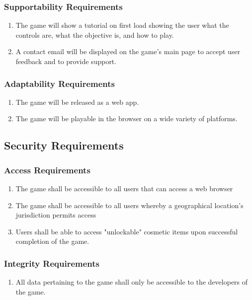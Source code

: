 \documentclass[]{article}
\begin{document}
\subsubsection{Supportability Requirements}
\label{ssub:supportability_requirements}
\begin{enumerate}[{MS}1. ]
	\item The game will show a tutorial on first load showing the user what the controls are, what the objective is, and how to play. 
	\item A contact email will be displayed on the game's main page to accept user feedback and to provide support.
\end{enumerate}

\subsubsection{Adaptability Requirements}
\label{ssub:adaptability_requirements}
\begin{enumerate}[{MS}1. ]
	\item The game will be released as a web app.
	\item The game will be playable in the browser on a wide variety of platforms.
\end{enumerate}

\subsection{Security Requirements}
\label{sub:security_requirements}

\subsubsection{Access Requirements}
\label{ssub:access_requirements}
\begin{enumerate}[{SR}1. ]
	\item The game shall be accessible to all users that can access a web browser
	\item The game shall be accessible to all users whereby a geographical location's jurisdiction permits access
	\item Users shall be able to access "unlockable" cosmetic items upon successful completion of the game.
\end{enumerate}

\subsubsection{Integrity Requirements}
\label{ssub:integrity_requirements}
\begin{enumerate}[{SR}1. ]
	\item All data pertaining to the game shall only be accessible to the developers of the game.
\end{enumerate}
\end{document}
